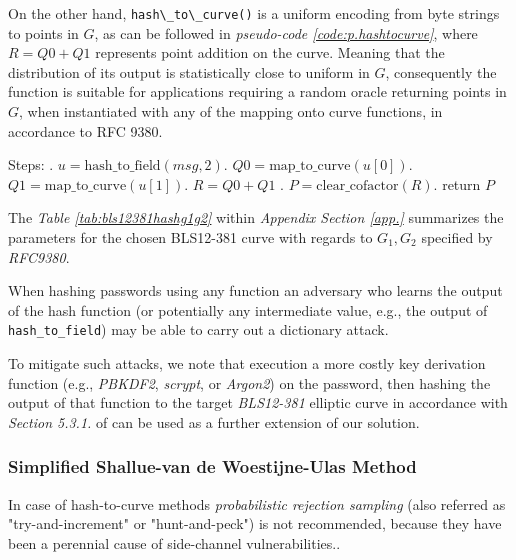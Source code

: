 On the other hand, \lstinline|hash\_to\_curve()| is a uniform encoding from byte  strings to points in $G$, as can be followed  in \textit{pseudo-code \ref{code:p.hashtocurve}}, where $R = Q0 + Q1$ represents point addition on the curve. Meaning that the distribution of its output is statistically close to uniform in $G$, consequently the function is suitable for applications requiring a random oracle returning points in $G$, when instantiated with any of the mapping onto curve functions, in accordance to RFC 9380\cite{ecc.hashing}.

\begin{algorithm}[H]
	\SetAlgoLined
	Steps: . $u = \mathrm{hash\_to\_field}(msg, 2)$. $Q0 = \mathrm{map\_to\_curve}(u[0])$. $Q1 = \mathrm{map\_to\_curve}(u[1])$. $R = Q0 + Q1$ . $P = \mathrm{clear\_cofactor}(R)$. return $P$\;
	\caption{Pseudocode for hashing to elliptic curve\cite{ecc.hashing} under  Random-Oracle Model}\label{code:p.hashtocurve}
\end{algorithm}

The   \textit{Table \ref{tab:bls12381hashg1g2}}  within \textit{Appendix Section \ref{app.}} summarizes the parameters for the chosen BLS12-381 curve with regards to $G_1, G_2$ specified by \textit{RFC9380}\cite{ecc.hashing}. 

When hashing passwords using any function an adversary who learns the output of the hash function (or potentially any intermediate value, e.g., the output of
\lstinline|hash_to_field|) may be able to carry out a dictionary attack.\cite{ecc.hashing}    

To mitigate such attacks, we note that execution a more  costly key derivation function  (e.g., \textit{PBKDF2}, \textit{scrypt}, or \textit{Argon2})  on the password, then hashing the output of that function to the target \textit{BLS12-381} elliptic curve in accordance with \textit{Section 5.3.1.} of \cite{ecc.hashing} can be used as a further extension of our solution. \cite{ecc.hashing}


\subsubsection{Simplified Shallue-van de Woestijne-Ulas Method}

In case of hash-to-curve methods \textit{probabilistic rejection sampling} (also referred as "try-and-increment" or "hunt-and-peck") is not recommended, because they have been a perennial cause of side-channel vulnerabilities.\cite{ecc.hashing}.

